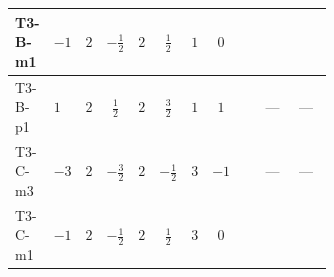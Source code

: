 \documentclass[8pt]{article}
\begin{document}
\begin{landscape}
\begin{longtable}{@{}llcccccc >{\raggedright\arraybackslash}p{0.21\linewidth} >{\raggedright\arraybackslash}p{0.21\linewidth} >{\raggedright\arraybackslash}p{0.21\linewidth}@{}}
T3-B-m1 & $-1$ & $2$ & $-\frac{1}{2}$ & $2$ & $\frac{1}{2}$ & $1$ & $0$ & \scriptsize\adjustbox{max width=\linewidth}{$\begin{gathered} +\frac{3 {\lambda_{HS_1}^{(A)}}^2}{4}\end{gathered}$} & \scriptsize\adjustbox{max width=\linewidth}{$\begin{gathered} +{\lambda_{H H^\dagger S_1^\dagger S_2^\dagger}^{\rm Cross}} \left(\frac{1}{2} \operatorname{Tr}\!\left({y_1}\,\left({y_2}\right)^{\dagger}\right)+4 \left({\lambda_{H H^\dagger S_1^\dagger S_2^\dagger}^{\rm Cross}}\right)^{*}+3 \left({\lambda_{11}}\right)^{*}\right)\end{gathered}$} & \scriptsize\adjustbox{max width=\linewidth}{$\begin{gathered} +\frac{1}{2} \left({\lambda_{H H^\dagger S_1^\dagger S_2^\dagger}^{\rm Cross}}\right)^{*} \operatorname{Tr}\!\left({y_2}\,\left({y_1}\right)^{\dagger}\right)\end{gathered}$} \\
\midrule
T3-B-p1 & $1$ & $2$ & $\frac{1}{2}$ & $2$ & $\frac{3}{2}$ & $1$ & $1$ & \scriptsize\adjustbox{max width=\linewidth}{$\begin{gathered} +\frac{3 {\lambda_{HS_1}^{(A)}}^2}{4}\end{gathered}$} & --- & --- \\
\midrule
T3-C-m3 & $-3$ & $2$ & $-\frac{3}{2}$ & $2$ & $-\frac{1}{2}$ & $3$ & $-1$ & \scriptsize\adjustbox{max width=\linewidth}{$\begin{gathered} +\frac{3 {\lambda_{HS_1}^{(A)}}^2}{4}\end{gathered}$} & --- & --- \\
\midrule
T3-C-m1 & $-1$ & $2$ & $-\frac{1}{2}$ & $2$ & $\frac{1}{2}$ & $3$ & $0$ & \scriptsize\adjustbox{max width=\linewidth}{$\begin{gathered} +\frac{3 {\lambda_{HS_1}^{(A)}}^2}{4}\end{gathered}$} & \scriptsize\adjustbox{max width=\linewidth}{$\begin{gathered} +{\lambda_{H H^\dagger S_1^\dagger S_2^\dagger}^{\rm Cross}} \left(\frac{3}{4} \operatorname{Tr}\!\left({y_1}\,\left({y_2}\right)^{\dagger}\right)+4 \left({\lambda_{H H^\dagger S_1^\dagger S_2^\dagger}^{\rm Cross}}\right)^{*}+3 \left({\lambda_{11}}\right)^{*}\right)\end{gathered}$} & \scriptsize\adjustbox{max width=\linewidth}{$\begin{gathered} +\frac{3}{4} \left({\lambda_{H H^\dagger S_1^\dagger S_2^\dagger}^{\rm Cross}}\right)^{*} \operatorname{Tr}\!\left({y_2}\,\left({y_1}\right)^{\dagger}\right)\end{gathered}$} \\

\end{longtable}
\end{landscape}
\end{document}
